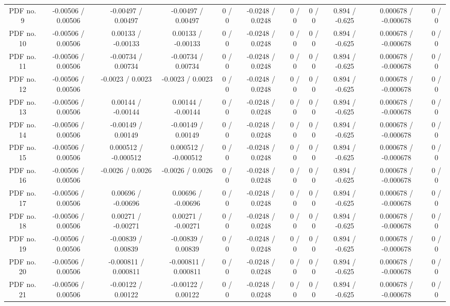 \begin{table}[htbp]
\begin{center}
\begin{tabular}{|c|c|c|c|c|c|c|c|c|c|c|}
  PDF no. 9 & -0.00506 / 0.00506 & -0.00497 / 0.00497 & -0.00497 / 0.00497 & 0 / 0 & -0.0248 / 0.0248 & 0 / 0 & 0 / 0 & 0.894 / -0.625 & 0.000678 / -0.000678 & 0 / 0 \\ 
  PDF no. 10 & -0.00506 / 0.00506 & 0.00133 / -0.00133 & 0.00133 / -0.00133 & 0 / 0 & -0.0248 / 0.0248 & 0 / 0 & 0 / 0 & 0.894 / -0.625 & 0.000678 / -0.000678 & 0 / 0 \\ 
  PDF no. 11 & -0.00506 / 0.00506 & -0.00734 / 0.00734 & -0.00734 / 0.00734 & 0 / 0 & -0.0248 / 0.0248 & 0 / 0 & 0 / 0 & 0.894 / -0.625 & 0.000678 / -0.000678 & 0 / 0 \\ 
  PDF no. 12 & -0.00506 / 0.00506 & -0.0023 / 0.0023 & -0.0023 / 0.0023 & 0 / 0 & -0.0248 / 0.0248 & 0 / 0 & 0 / 0 & 0.894 / -0.625 & 0.000678 / -0.000678 & 0 / 0 \\ 
  PDF no. 13 & -0.00506 / 0.00506 & 0.00144 / -0.00144 & 0.00144 / -0.00144 & 0 / 0 & -0.0248 / 0.0248 & 0 / 0 & 0 / 0 & 0.894 / -0.625 & 0.000678 / -0.000678 & 0 / 0 \\ 
  PDF no. 14 & -0.00506 / 0.00506 & -0.00149 / 0.00149 & -0.00149 / 0.00149 & 0 / 0 & -0.0248 / 0.0248 & 0 / 0 & 0 / 0 & 0.894 / -0.625 & 0.000678 / -0.000678 & 0 / 0 \\ 
  PDF no. 15 & -0.00506 / 0.00506 & 0.000512 / -0.000512 & 0.000512 / -0.000512 & 0 / 0 & -0.0248 / 0.0248 & 0 / 0 & 0 / 0 & 0.894 / -0.625 & 0.000678 / -0.000678 & 0 / 0 \\ 
  PDF no. 16 & -0.00506 / 0.00506 & -0.0026 / 0.0026 & -0.0026 / 0.0026 & 0 / 0 & -0.0248 / 0.0248 & 0 / 0 & 0 / 0 & 0.894 / -0.625 & 0.000678 / -0.000678 & 0 / 0 \\ 
  PDF no. 17 & -0.00506 / 0.00506 & 0.00696 / -0.00696 & 0.00696 / -0.00696 & 0 / 0 & -0.0248 / 0.0248 & 0 / 0 & 0 / 0 & 0.894 / -0.625 & 0.000678 / -0.000678 & 0 / 0 \\ 
  PDF no. 18 & -0.00506 / 0.00506 & 0.00271 / -0.00271 & 0.00271 / -0.00271 & 0 / 0 & -0.0248 / 0.0248 & 0 / 0 & 0 / 0 & 0.894 / -0.625 & 0.000678 / -0.000678 & 0 / 0 \\ 
  PDF no. 19 & -0.00506 / 0.00506 & -0.00839 / 0.00839 & -0.00839 / 0.00839 & 0 / 0 & -0.0248 / 0.0248 & 0 / 0 & 0 / 0 & 0.894 / -0.625 & 0.000678 / -0.000678 & 0 / 0 \\ 
  PDF no. 20 & -0.00506 / 0.00506 & -0.000811 / 0.000811 & -0.000811 / 0.000811 & 0 / 0 & -0.0248 / 0.0248 & 0 / 0 & 0 / 0 & 0.894 / -0.625 & 0.000678 / -0.000678 & 0 / 0 \\ 
  PDF no. 21 & -0.00506 / 0.00506 & -0.00122 / 0.00122 & -0.00122 / 0.00122 & 0 / 0 & -0.0248 / 0.0248 & 0 / 0 & 0 / 0 & 0.894 / -0.625 & 0.000678 / -0.000678 & 0 / 0 \\ 

\end{tabular}
\end{center}
\end{table}

